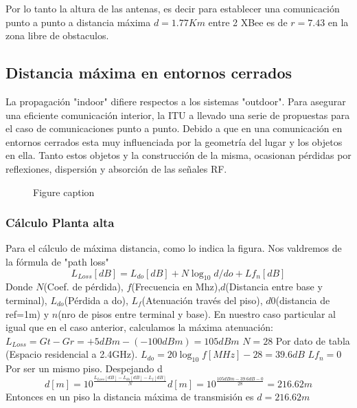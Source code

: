 \documentclass[11pt,oneside,spanish,a4paper]{article}
\begin{document}
Por lo tanto la altura de las antenas, es decir para establecer una comunicaci\'on punto a punto a distancia m\'axima $d=1.77Km$ entre 2 XBee es de $r=7.43$ en la zona libre de obstaculos.

\subsection{Distancia m\'axima en entornos cerrados}

La propagaci\'on "indoor" difiere respectos a los sistemas "outdoor". Para asegurar una eficiente comunicaci\'on interior, la ITU a llevado una serie de propuestas para el caso de comunicaciones punto a punto. Debido a que en una comunicaci\'on en entornos cerrados esta muy influenciada por la geometr\'ia del lugar y los objetos en ella. Tanto estos objetos y la construcci\'on de la misma, ocasionan p\'erdidas por reflexiones, dispersi\'on y absorci\'on de las se\~nales RF.  

\begin{figure}[h]
\caption{Figure caption}
\end{figure}

\subsubsection{C\'alculo Planta alta}
Para el c\'alculo de m\'axima distancia, como lo indica la figura. Nos valdremos de la f\'ormula de "path loss"
\begin{equation*}
\label{eq:pathLoss}
L_{Loss}[dB] = L_{do}[dB] + N \log_{10}d/do + Lf_{n}[dB]
\end{equation*}
Donde $N$(Coef. de p\'erdida), $f$(Frecuencia en Mhz),$d$(Distancia entre base y terminal), $L_{do}$(P\'erdida a do), $L_{f}$(Atenuaci\'on trav\'es del piso), $d0$(distancia de ref=1m) y $n$(nro de pisos entre terminal y base).
En nuestro caso particular al igual que en el caso anterior, calculamos la m\'axima atenuaci\'on:
$L_{Loss}= Gt - Gr = +5dBm - (-100dBm) = 105dBm$
$N=28$ Por dato de tabla (Espacio residencial a 2.4GHz).
$L_{do} = 20 \log_{10}f[MHz] - 28 = 39.6dB$
$Lf_{n} = 0$ Por ser un mismo piso.
Despejando d
\begin{equation*}
\label{eq:calculod}
d[m] = 10 ^{\frac{L_{Loss}[dB] - L_{do}[dB] - L_{f}[dB]}{N}} 
d[m] = 10 ^{\frac{105dBm - 39.6dB - 0}{28}} = 216.62m
\end{equation*}
Entonces en un piso la distancia m\'axima de transmisi\'on es $d=216.62m$
\end{document}
